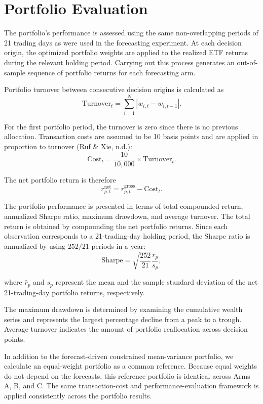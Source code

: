 \documentclass[12pt,a4paper,twoside,openany]{book}
\begin{document}
\section{Portfolio Evaluation}\label{portfolio-evaluation}

The portfolio's performance is assessed using the same non-overlapping periods of 21 trading days as were used in the forecasting experiment. At each decision origin, the optimized portfolio weights are applied to the realized ETF returns during the relevant holding period. Carrying out this process generates an out-of-sample sequence of portfolio returns for each forecasting arm.

Portfolio turnover between consecutive decision origins is calculated as
\[
\mathrm{Turnover}_{t}
=
\sum_{i=1}^{N}
\left|w_{i,t}-w_{i,t-1}\right|.
\]

For the first portfolio period, the turnover is zero since there is no previous allocation. Transaction costs are assumed to be 10 basis points and are applied in proportion to turnover (Ruf \& Xie, n.d.):
\[
\mathrm{Cost}_{t}
=
\frac{10}{10{,}000}
\times
\mathrm{Turnover}_{t}.
\]

The net portfolio return is therefore
\[
r^{\mathrm{net}}_{p,t}
=
r^{\mathrm{gross}}_{p,t}
-
\mathrm{Cost}_{t}.
\]

The portfolio performance is presented in terms of total compounded return, annualized Sharpe ratio, maximum drawdown, and average turnover. The total return is obtained by compounding the net portfolio returns. Since each observation corresponds to a 21-trading-day holding period, the Sharpe ratio is annualized by using \(252/21\) periods in a year:
\[
\mathrm{Sharpe}
=
\sqrt{\frac{252}{21}}
\frac{\bar{r}_{p}}{s_{p}},
\]

where \(\bar{r}_{p}\) and \(s_{p}\) represent the mean and the sample standard deviation of the net 21-trading-day portfolio returns, respectively.

The maximum drawdown is determined by examining the cumulative wealth series and represents the largest percentage decline from a peak to a trough. Average turnover indicates the amount of portfolio reallocation across decision points.

In addition to the forecast-driven constrained mean-variance portfolio, we calculate an equal-weight portfolio as a common reference. Because equal weights do not depend on the forecasts, this reference portfolio is identical across Arms A, B, and C. The same transaction-cost and performance-evaluation framework is applied consistently across the portfolio results.
\end{document}
